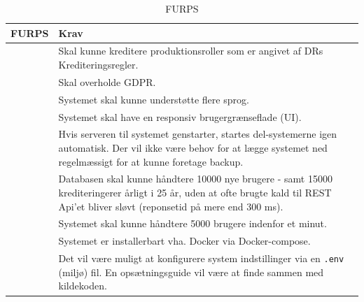 \begin{table}[ht]
    \centering
    \begin{tabularx}{\textwidth}{|>{\RaggedRight}p{3.5cm}|>{\RaggedRight}X|}
        \hline
        \textbf{FURPS}                      & \textbf{Krav} \\ 
        \hline
        \multirow{3}{*}{Functionality}      & Skal kunne kreditere produktionsroller som er angivet af DRs Krediteringsregler.  \\ \cline{2-2} 
                                            & Skal overholde GDPR. \\ \hline
        \multirow{2}{*}{Usability}          & Systemet skal kunne understøtte flere sprog. \\ \cline{2-2}
                                            & Systemet skal have en responsiv brugergrænseflade (UI). \\ \hline
        \multirow{3}{*}{Reliability}        & Hvis serveren til systemet genstarter, startes del-systemerne igen automatisk. Der vil ikke være behov for at lægge systemet ned regelmæssigt for at kunne foretage backup. \\ \hline
        \multirow{4}{*}{Performance}        & Databasen skal kunne håndtere 10000 nye brugere - samt 15000 krediteringerer årligt i 25 år, uden at ofte brugte kald til REST Api'et bliver sløvt (reponsetid på mere end 300 ms). \\ \cline{2-2}
                                            & Systemet skal kunne håndtere 5000 brugere indenfor et minut.\\ \hline
        \multirow{4}{*}{Supportability}     & Systemet er installerbart vha. Docker via Docker-compose.\\ \cline{2-2}
                                            & Det vil være muligt at konfigurere system indstillinger via en \texttt{.env} (miljø) fil. En opsætningsguide vil være at finde sammen med kildekoden. \\ \hline
    \end{tabularx}
    \caption{FURPS}
    \label{tab:furps}
\end{table}